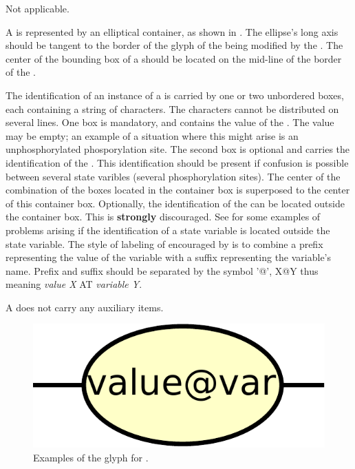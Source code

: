 \begin{glyphDescription}

\glyphSboTerm Not applicable.

\glyphContainer A  is represented by an elliptical container, as shown in .  The ellipse's long axis should be tangent to the border of the glyph of the  being modified by the . The center of the bounding box of a  should be located on the mid-line of the border of the .

\glyphLabel The identification of an instance of a  is carried by one or two unbordered boxes, each containing a string of characters.  The characters cannot be distributed on several lines.  One box is mandatory, and contains the value of the .  The value may be empty; an example of a situation where this might arise is an unphosphorylated phosporylation site.  The second box is optional and carries the identification of the .  This identification should be present if confusion is possible between several state varibles (\eg several phosphorylation sites).  The center of the combination of the boxes located in the container box is superposed to the center of this container box.  Optionally, the identification of the  can be located outside the  container box.  This is \textbf{strongly} discouraged.  See  for some examples of problems arising if the identification of a state variable is located outside the state variable.  The style of labeling of  encouraged by \SBGNPDLone is to combine a prefix representing the value of the variable with a suffix representing the variable's name.  Prefix and suffix should be separated by the symbol '@', X@Y thus meaning \emph{value X} AT \emph{variable Y}.

\glyphAux A  does not carry any auxiliary items.  

\end{glyphDescription}

\begin{figure}[H]
  \centering
  \includegraphics[scale = 0.3, trim = 0 0 0 0.25in]{images/stateVariable}
  \caption{Examples of the \PD glyph for .}
  \label{fig:state-var}
\end{figure}

